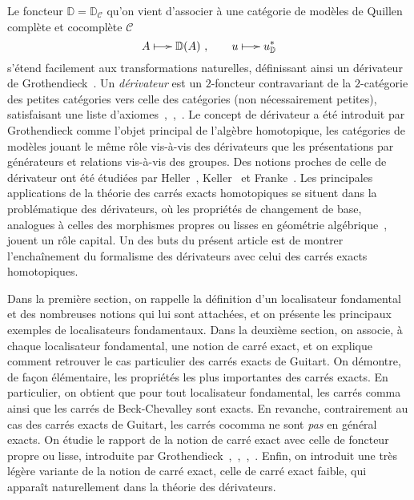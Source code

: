 \documentclass[francais]{smfart}
\theoremstyle{plain}
\theoremstyle{remark}
\theoremstyle{definition}
\numberwithin{equation}{thm}
\begin{document}
Le foncteur ${\mathbb{D}}={\mathbb{D}}_{\mathcal{C}}$ qu'on vient d'associer à une catégorie de modèles de Quillen complète et cocomplète  ${\mathcal{C}}$
\[
A{{\mathchoice{{\hskip -2.5pt\xymatrixcolsep{1.3pc}\xymatrix{\ar@{|->}[r]&}\hskip -2.5pt}}{{\hskip -2.5pt\xymatrixcolsep{.7pc}\xymatrix{\ar@{|->}[r]&}\hskip -2.5pt}}{{\scriptstyle\kern 1.5pt\mapsto\kern 1.5pt}}{{\scriptscriptstyle\kern .5pt\mapsto\kern .5pt}}}}{\mathbb{D}}(A){\ },\qquad u{{\mathchoice{{\hskip -2.5pt\xymatrixcolsep{1.3pc}\xymatrix{\ar@{|->}[r]&}\hskip -2.5pt}}{{\hskip -2.5pt\xymatrixcolsep{.7pc}\xymatrix{\ar@{|->}[r]&}\hskip -2.5pt}}{{\scriptstyle\kern 1.5pt\mapsto\kern 1.5pt}}{{\scriptscriptstyle\kern .5pt\mapsto\kern .5pt}}}} u^*_{\mathbb{D}}
\]
s'étend facilement aux transformations naturelles, définissant ainsi un dérivateur de Grothendieck~\cite{CiDer}. Un \emph{dérivateur} est un $2${\nobreakdash}-foncteur contravariant de la $2${\nobreakdash}-catégorie des petites catégories vers celle des catégories (non nécessairement petites), satisfaisant une liste d'axiomes~\cite{PS},~\cite{Der},~\cite{Mal1}. Le concept de dérivateur a été introduit par Grothendieck comme l'objet principal de l'algèbre homotopique, les catégories de modèles jouant le même rôle vis-à-vis des dérivateurs que les présentations par générateurs et relations vis-à-vis des groupes. Des notions proches de celle de dérivateur ont été étudiées par Heller~\cite{Hel,Hel2,Hel3,Hel4}, Keller~\cite{Bernhard} et Franke~\cite{Franke}. Les principales applications de la théorie des carrés exacts homotopiques se situent dans la problématique des dérivateurs, où les propriétés de changement de base, analogues à celles des morphismes propres ou lisses en géométrie algébrique~\cite[exposés~12, 13 et 16]{SGA4}, jouent un rôle capital. Un des buts du présent article est de montrer l'enchaînement du formalisme des dérivateurs avec celui des carrés exacts homotopiques.
\smallbreak

Dans la première section, on rappelle la définition d'un localisateur fondamental et des nombreuses notions qui lui sont attachées, et on présente les principaux exemples de localisateurs fondamentaux. Dans la deuxième section, on associe, à chaque localisateur fondamental, une notion de carré exact, et on explique comment retrouver le cas particulier des carrés exacts de Guitart. On démontre, de façon élémentaire, les propriétés les plus importantes des carrés exacts. En particulier, on obtient que pour tout localisateur fondamental, les carrés comma ainsi que les carrés de Beck-Chevalley sont exacts. En revanche, contrairement au cas des carrés exacts de Guitart, les carrés cocomma ne sont \emph{pas} en général exacts. On étudie le rapport de la notion de carré exact avec celle de foncteur propre ou lisse, introduite par Grothendieck~\cite{PS},~\cite{Der},~\cite{Ast},~\cite{Mal2}. Enfin, on introduit une très légère variante de la notion de carré exact, celle de carré exact faible, qui apparaît naturellement dans la théorie des dérivateurs.
\smallbreak
\end{document}
